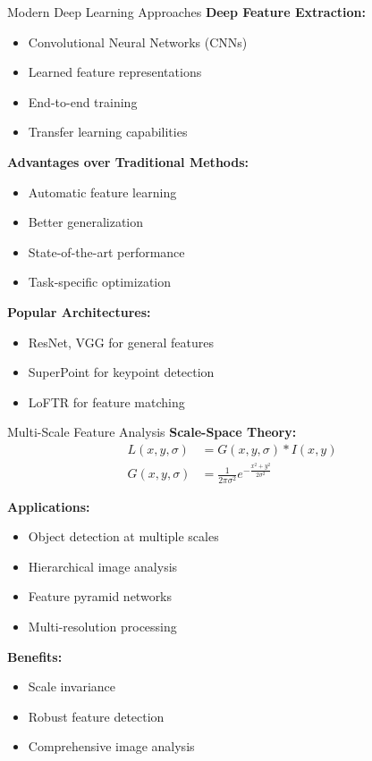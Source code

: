 \documentclass[aspectratio=169,10pt]{beamer}
\begin{document}
\begin{frame}{Modern Deep Learning Approaches}
    \textbf{Deep Feature Extraction:}
    \begin{itemize}
        \item Convolutional Neural Networks (CNNs)
        \item Learned feature representations
        \item End-to-end training
        \item Transfer learning capabilities
    \end{itemize}

    \textbf{Advantages over Traditional Methods:}
    \begin{itemize}
        \item Automatic feature learning
        \item Better generalization
        \item State-of-the-art performance
        \item Task-specific optimization
    \end{itemize}

    \textbf{Popular Architectures:}
    \begin{itemize}
        \item ResNet, VGG for general features
        \item SuperPoint for keypoint detection
        \item LoFTR for feature matching
    \end{itemize}
\end{frame}

\begin{frame}{Multi-Scale Feature Analysis}
    \textbf{Scale-Space Theory:}
    \begin{align}
        L(x,y,\sigma) &= G(x,y,\sigma) * I(x,y) \\
        G(x,y,\sigma) &= \frac{1}{2\pi\sigma^2} e^{-\frac{x^2+y^2}{2\sigma^2}}
    \end{align}

    \textbf{Applications:}
    \begin{itemize}
        \item Object detection at multiple scales
        \item Hierarchical image analysis
        \item Feature pyramid networks
        \item Multi-resolution processing
    \end{itemize}

    \textbf{Benefits:}
    \begin{itemize}
        \item Scale invariance
        \item Robust feature detection
        \item Comprehensive image analysis
    \end{itemize}
\end{frame}
\end{document}
